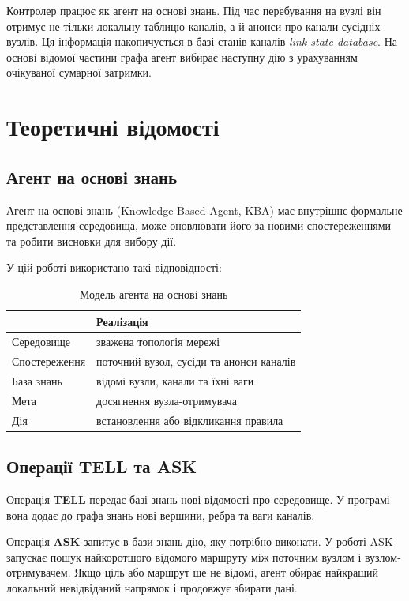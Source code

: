 \documentclass[12pt,a4paper]{article}
\begin{document}
Контролер працює як агент на основі знань. Під час перебування на вузлі він
отримує не тільки локальну таблицю каналів, а й анонси про канали сусідніх
вузлів. Ця інформація накопичується в базі станів каналів
\textit{link-state database}. На основі відомої частини графа агент вибирає
наступну дію з урахуванням очікуваної сумарної затримки.

\section{Теоретичні відомості}

\subsection{Агент на основі знань}

Агент на основі знань (Knowledge-Based Agent, KBA) має внутрішнє формальне
представлення середовища, може оновлювати його за новими спостереженнями та
робити висновки для вибору дії.

У цій роботі використано такі відповідності:

\begin{table}[H]
\centering
\begin{tabular}{>{\raggedright\arraybackslash}p{} p{}}
\toprule
{\small\bfseries Поняття} & {\small\bfseries Реалізація}\\
\midrule
Середовище & зважена топологія мережі\\
Спостереження & поточний вузол, сусіди та анонси каналів\\
База знань & відомі вузли, канали та їхні ваги\\
Мета & досягнення вузла-отримувача\\
Дія & встановлення або відкликання правила\\
\bottomrule
\end{tabular}
\caption{Модель агента на основі знань}
\end{table}

\subsection{Операції TELL та ASK}

Операція \textbf{TELL} передає базі знань нові відомості про середовище.
У програмі вона додає до графа знань нові вершини, ребра та ваги каналів.

Операція \textbf{ASK} запитує в бази знань дію, яку потрібно виконати.
У роботі ASK запускає пошук найкоротшого відомого маршруту між поточним
вузлом і вузлом-отримувачем. Якщо ціль або маршрут ще не відомі, агент
обирає найкращий локальний невідвіданий напрямок і продовжує збирати дані.
\end{document}
